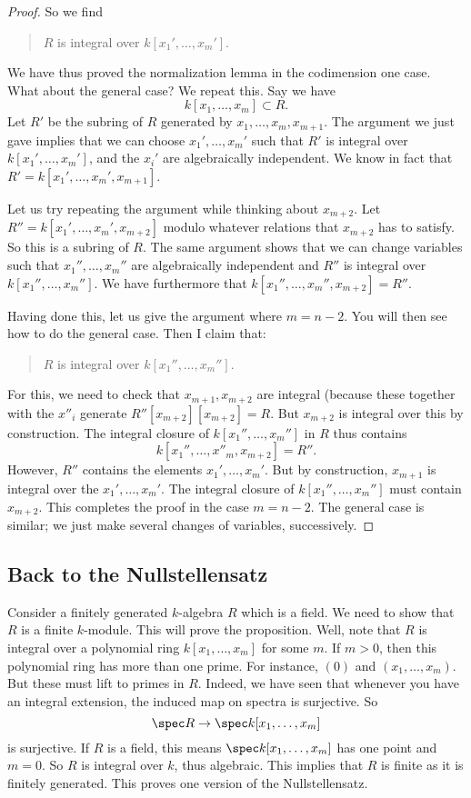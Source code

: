 \begin{proof}
So we find
\begin{quote}
$R$ is integral over $k[x_1', \dots, x_m']$. 
\end{quote}

We have thus proved the normalization lemma in the codimension one case. What
about the general case? We repeat this. 
Say we have
\[ k[x_1, \dots, x_m] \subset R.  \]
Let $R'$ be the subring of $R$ generated by $x_{1}, \dots,x_m, x_{m+1}$. The
argument we just gave implies that we can choose $x_1', \dots, x_m'$ such that
$R'$ is integral over $k[x_1', \dots, x_m']$, and the $x_i'$ are
algebraically independent. 
We know in fact that $R' = k[x_1', \dots, x_m', x_{m+1}]$. 

Let us try repeating the argument while thinking about $x_{m+2}$. Let $R'' =
k[x_1', \dots, x_m', x_{m+2}]$ modulo whatever relations that $x_{m+2}$ has to
satisfy. So this is a subring of $R$. The same argument shows that we can
change variables such that $x_1'', \dots, x_m''$ are algebraically independent
and $R''$ is integral over $k[x_1'', \dots, x_m'']$. We have furthermore that
$k[x_1'', \dots, x_m'', x_{m+2}] = R''$. 

Having done this, let us give the argument where $m=n-2$. You will then see
how to do the general case. Then I claim that:
\begin{quote}
$R$ is integral over $k[x_1'', \dots, x_m'']$.
\end{quote}
For this, we need to check that $x_{m+1}, x_{m+2}$ are integral (because these
together with the $x''_i$ generate $R''[x_{m+2}][x_{m+2}]=R$. 
But $x_{m+2}$ is integral over this by construction. The integral closure of
$k[x_1'', \dots, x_{m}'']$ in $R$ thus contains
\[ k[x_1'', \dots, x''_m, x_{m+2}] = R''.  \]
However, $R''$ contains the elements $x_1', \dots, x_m'$. But by construction,
$x_{m+1}$ is integral over the $x_1', \dots, x_m'$. The integral closure of
$k[x_1'', \dots, x_{m}'']$ must contain $x_{m+2}$. This completes the proof in
the case $m=n-2$. The general case is similar; we just make several changes of
variables, successively.

\end{proof} 
\subsection{Back to the Nullstellensatz}

Consider a finitely generated $k$-algebra $R$ which is a field. We need to show that $R$ is a
finite $k$-module. This will prove the proposition.
Well, note that $R$ is integral over a polynomial ring $k[x_1, \dots, x_m]$ for
some $m$.
If $m > 0$, then this polynomial ring has more than one prime. 
For instance, $(0)$ and $(x_1, \dots, x_m)$. But these must lift to primes in
$R$. Indeed, we have seen that whenever you have an integral extension, the
induced map on spectra is surjective. So 
\[ \spec R \to \spec k[x_1, \dots, x_m]  \]
is surjective. If $R$ is a field, this means $\spec k[x_1, \dots, x_m]$ has one
point and $m=0$. So $R$ is integral over $k$, thus algebraic. This implies that
$R$ is finite as it is finitely generated. This proves one version of the
Nullstellensatz. 


